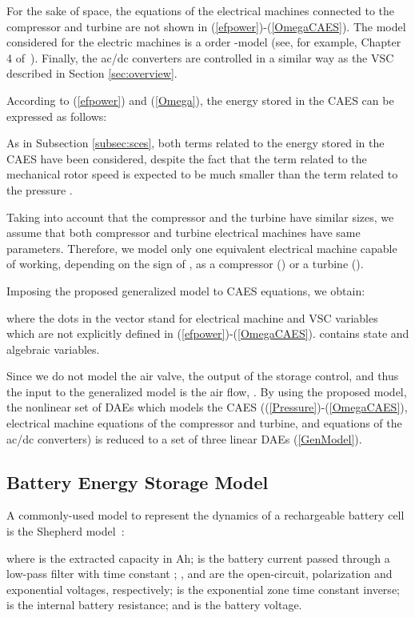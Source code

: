 \documentclass[journal, a4paper]{IEEEtran}
\begin{document}
For the sake of space, the equations of the electrical machines
  connected to the compressor and turbine are not shown in
  (\ref{efpower})-(\ref{OmegaCAES}).  The model considered for the
  electric machines is a  order -model (see, for
  example, Chapter 4 of~\cite{Krause:02}).  Finally, the ac/dc
  converters are controlled in a similar way as the VSC described in
  Section \ref{sec:overview}.

According to (\ref{efpower}) and (\ref{Omega}), the energy stored in
the CAES can be expressed as follows:
 

As in Subsection \ref{subsec:sces}, both terms related to the energy
stored in the CAES have been considered, despite the fact that the
term related to the mechanical rotor speed  is expected to be
much smaller than the term related to the pressure .

Taking into account that the compressor and the turbine have similar
sizes, we assume that both compressor and turbine electrical machines
have same parameters.  Therefore, we model only one equivalent
electrical machine capable of working, depending on the sign of ,
as a compressor () or a turbine ().

Imposing the proposed generalized model to CAES equations, we obtain:

where the dots in the vector  stand for
electrical machine and VSC variables which are not explicitly defined
in (\ref{efpower})-(\ref{OmegaCAES}).   contains  state
and algebraic variables. 

Since we do not model the air valve, the output of the storage
control, and thus the input to the generalized model  is the air
flow, .  By using the proposed model, the nonlinear set of DAEs
which models the CAES ((\ref{Pressure})-(\ref{OmegaCAES}),
electrical machine equations of the compressor and turbine, and
equations of the ac/dc converters) is reduced to a set of three linear
DAEs (\ref{GenModel}).



\subsection{Battery Energy Storage Model}
\label{subsec:bess}

A commonly-used model to represent the dynamics of a rechargeable battery
cell is the Shepherd model~\cite{shepherd:65}:

where  is the extracted capacity in Ah;  is the
battery current  passed through a low-pass filter with time
constant ; ,  and  are
the open-circuit, polarization and exponential voltages, respectively;
 is the exponential zone time constant inverse;  is the internal battery resistance; and  is the
battery voltage.
\end{document}
